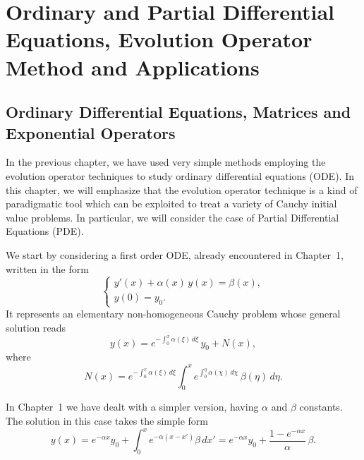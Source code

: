 
\chapter{Ordinary and Partial Differential Equations, Evolution Operator Method and Applications}

\section{Ordinary Differential Equations, Matrices and Exponential Operators}

In the previous chapter, we have used very simple methods employing the evolution operator techniques to study ordinary differential equations (ODE). In this chapter, we will emphasize that the evolution operator technique is a kind of paradigmatic tool which can be exploited to treat a variety of Cauchy initial value problems. In particular, we will consider the case of Partial Differential Equations (PDE).

We start by considering a first order ODE, already encountered in Chapter~1, written in the form
\begin{equation}
\begin{cases}
y'(x)+\alpha(x)\,y(x)=\beta(x),\\[2mm]
y(0)=y_{0}.
\end{cases}
\label{eq:2.1.1}
\end{equation}
It represents an elementary non-homogeneous Cauchy problem whose general solution reads
\begin{equation}
y(x)=e^{-\int_{0}^{x}\alpha(\xi)\,d\xi}\,y_{0}+N(x),
\label{eq:2.1.2}
\end{equation}
where
\begin{equation}
N(x)=e^{-\int_{0}^{x}\alpha(\xi)\,d\xi}
\int_{0}^{x} e^{\int_{0}^{\eta}\alpha(\chi)\,d\chi}\,\beta(\eta)\,d\eta.
\label{eq:2.1.3}
\end{equation}

In Chapter~1 we have dealt with a simpler version, having $\alpha$ and $\beta$ constants. The solution in this case takes the simple form
\begin{equation}
y(x)=e^{-\alpha x}y_{0}+\int_{0}^{x}e^{-\alpha(x-x')}\beta\,dx'
=e^{-\alpha x}y_{0}+\frac{1-e^{-\alpha x}}{\alpha}\,\beta.
\label{eq:2.1.4}
\end{equation}

